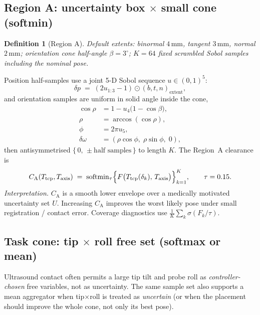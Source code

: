 \documentclass[11pt,a4paper]{article}
\newtheorem{definition}{Definition}
\newcommand{\Tcp}{T_{\mathrm{tcp}}}
\newcommand{\Taxis}{T_{\mathrm{axis}}}
\newcommand{\softmin}{\operatorname{softmin}}
\begin{document}
\subsection{Region A: uncertainty box \(\times\) small cone (softmin)}
\label{sec:region-a}

\begin{definition}[Region A]
Default extents: binormal \(4\,\mathrm{mm}\), tangent \(3\,\mathrm{mm}\),
normal \(2\,\mathrm{mm}\); orientation cone half-angle \(\beta=3^{\circ}\);
\(K=64\) fixed scrambled Sobol samples including the nominal pose.
\end{definition}

Position half-samples use a joint 5-D Sobol sequence \(u\in(0,1)^{5}\):
\begin{equation}
\label{eq:region-pos}
  \delta p
  \;=\;
  (2u_{1:3}-1)\odot
  (b,t,n)_{\mathrm{extent}},
\end{equation}
and orientation samples are uniform in solid angle inside the cone,
\begin{equation}
\label{eq:region-ori}
\begin{aligned}
  \cos\rho
  &=
  1-u_{4}\bigl(1-\cos\beta\bigr),
  \\
  \rho
  &=
  \arccos(\cos\rho),
  \\
  \phi
  &=
  2\pi u_{5},
  \\
  \delta\omega
  &=
  (\rho\cos\phi,\;\rho\sin\phi,\;0),
\end{aligned}
\end{equation}
then antisymmetrised \(\{\,0,\,\pm\text{half samples}\,\}\) to length \(K\).
The Region~A clearance is
\begin{equation}
\label{eq:region-a}
  C_{\mathrm{A}}(\Tcp,\Taxis)
  \;=\;
  \softmin_{\tau}
  \Bigl\{
    F\bigl(\Tcp(\delta_{k}),\,\Taxis\bigr)
  \Bigr\}_{k=1}^{K},
  \qquad
  \tau=0.15.
\end{equation}
\emph{Interpretation.}
\(C_{\mathrm{A}}\) is a smooth lower envelope over a medically motivated
uncertainty set \(U\). Increasing \(C_{\mathrm{A}}\) improves the worst
likely pose under small registration / contact error. Coverage diagnostics
use \(\frac{1}{K}\sum_{k}\sigma(F_{k}/\tau)\).

\subsection{Task cone: tip \(\times\) roll free set (softmax or mean)}
\label{sec:task-cone}

Ultrasound contact often permits a large tip tilt and probe roll as
\emph{controller-chosen} free variables, not as uncertainty. The same sample
set also supports a mean aggregator when tip$\times$roll is treated as
\emph{uncertain} (or when the placement should improve the whole cone, not
only its best pose).
\end{document}
